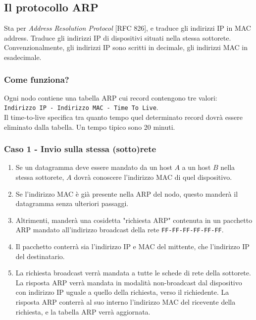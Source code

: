 \subsection{Il protocollo ARP}
Sta per \textit{Address Resolution Protocol} [RFC 826], e traduce gli indirizzi IP in MAC address. Traduce gli indirizzi IP di dispositivi situati nella stessa sottorete. Convenzionalmente, gli indirizzi IP sono scritti in decimale, gli indirizzi MAC in esadecimale.

\subsubsection{Come funziona?}
Ogni nodo contiene una tabella ARP cui record contengono tre valori: \\ \verb|Indirizzo IP - Indirizzo MAC - Time To Live|.\\
Il time-to-live specifica tra quanto tempo quel determinato record dovrà essere eliminato dalla tabella. Un tempo tipico sono 20 minuti.


\subsubsection{Caso 1 - Invio sulla stessa (sotto)rete}

\begin{enumerate}
	\item Se un datagramma deve essere mandato da un host $A$ a un host $B$ nella stessa sottorete, $A$ dovrà conoscere l'indirizzo MAC di quel dispositivo. 
	
	\item Se l'indirizzo MAC è già presente nella ARP del nodo, questo manderà il datagramma senza ulteriori passaggi.
	
	\item Altrimenti, manderà una cosidetta "richiesta ARP" contenuta in un pacchetto ARP mandato all'indirizzo broadcast della rete \verb|FF-FF-FF-FF-FF-FF|.
	
	\item Il pacchetto conterrà sia l'indirizzo IP e MAC del mittente, che l'indirizzo IP del destinatario.
	
	\item La richiesta broadcast verrà mandata a tutte le schede di rete della sottorete. La risposta ARP verrà mandata in modalità non-broadcast dal dispositivo con indirizzo IP uguale a quello della richiesta, verso il richiedente. La risposta ARP conterrà al suo interno l'indirizzo MAC del ricevente della richiesta, e la tabella ARP verrà aggiornata.
\end{enumerate}


